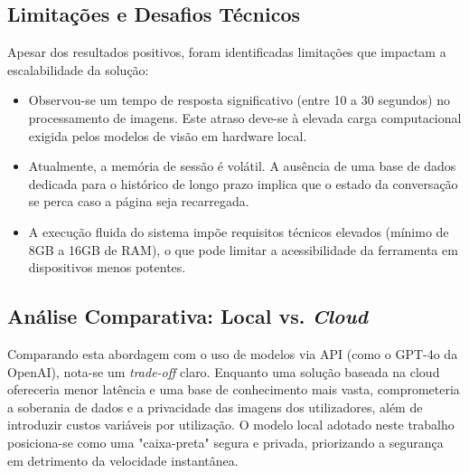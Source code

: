 \documentclass[a4paper,12pt]{scrreprt}
\begin{document}
        \subsection{Limitações e Desafios Técnicos}
        Apesar dos resultados positivos, foram identificadas limitações que impactam a escalabilidade da solução:
        \begin{itemize}
            \item Observou-se um tempo de resposta significativo (entre 10 a 30 segundos) no processamento de imagens. Este atraso deve-se à elevada carga computacional exigida pelos modelos de visão em hardware local.
            \item Atualmente, a memória de sessão é volátil. A ausência de uma base de dados dedicada para o histórico de longo prazo implica que o estado da conversação se perca caso a página seja recarregada.
            \item A execução fluida do sistema impõe requisitos técnicos elevados (mínimo de 8GB a 16GB de RAM), o que pode limitar a acessibilidade da ferramenta em dispositivos menos potentes.
        \end{itemize}

        \subsection{Análise Comparativa: Local vs. \textit{Cloud}}
        Comparando esta abordagem com o uso de modelos via API (como o GPT-4o da OpenAI), nota-se um \textit{trade-off} claro. Enquanto uma solução baseada na cloud ofereceria menor latência e uma base de conhecimento mais vasta, comprometeria a soberania de dados e a privacidade das imagens dos utilizadores, além de introduzir custos variáveis por utilização. O modelo local adotado neste trabalho posiciona-se como uma "caixa-preta" segura e privada, priorizando a segurança em detrimento da velocidade instantânea.


\end{document}
